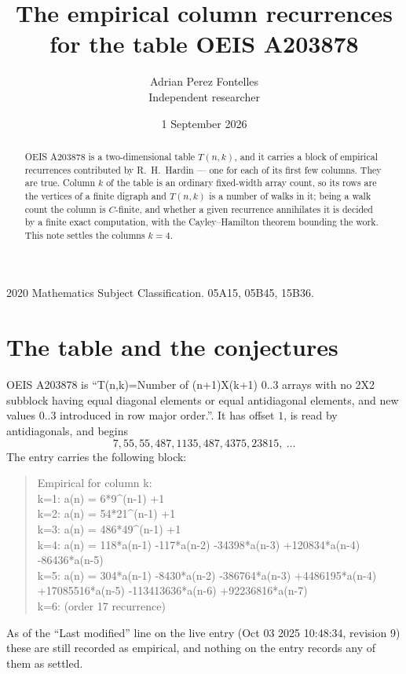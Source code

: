 \documentclass[11pt,a4paper]{article}
\title{The empirical column recurrences for the table OEIS A203878}
\author{Adrian Perez Fontelles\\ \small Independent researcher}
\date{1 September 2026}
\theoremstyle{plain}
\theoremstyle{definition}
\begin{document}
\maketitle

\begin{abstract}
OEIS A203878 is a two-dimensional table $T(n,k)$, and it carries a block of empirical
recurrences contributed by R.~H.~Hardin --- one for each of its first few columns. They are
true. Column $k$ of the table is an ordinary fixed-width array count, so its rows are the
vertices of a finite digraph and $T(n,k)$ is a number of walks in it; being a walk count the
column is $C$-finite, and whether a given recurrence annihilates it is decided by a finite
exact computation, with the Cayley--Hamilton theorem bounding the work. This note settles the columns $k=4$.
\end{abstract}

\noindent\small 2020 Mathematics Subject Classification. 05A15, 05B45, 15B36.\normalsize

\section{The table and the conjectures}

OEIS A203878 is ``T(n,k)=Number of (n+1)X(k+1) 0..3 arrays with no 2X2 subblock having equal diagonal elements or equal antidiagonal elements, and new values 0..3 introduced in row major order.''. It has offset $1$, is
read by antidiagonals, and begins
\[
7, 55, 55, 487, 1135, 487, 4375, 23815,\ \dots
\]
The entry carries the following block:
\begin{quote}\small
Empirical for column k:\\
k=1: a(n) = 6*9\^{}(n-1) +1\\
k=2: a(n) = 54*21\^{}(n-1) +1\\
k=3: a(n) = 486*49\^{}(n-1) +1\\
k=4: a(n) = 118*a(n-1) -117*a(n-2) -34398*a(n-3) +120834*a(n-4) -86436*a(n-5)\\
k=5: a(n) = 304*a(n-1) -8430*a(n-2) -386764*a(n-3) +4486195*a(n-4) +17085516*a(n-5) -113413636*a(n-6) +92236816*a(n-7)\\
k=6: (order 17 recurrence)\\
\end{quote}
As of the ``Last modified'' line on the live entry (Oct 03 2025 10:48:34, revision 9) these are still
recorded as empirical, and nothing on the entry records any of them as settled.
\end{document}
